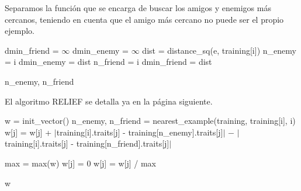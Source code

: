 \documentclass[12pt]{article}
\begin{document}
Separamos la función que se encarga de buscar los amigos y enemigos más cercanos, teniendo en cuenta que el amigo más cercano no puede ser el propio ejemplo.

\begin{algorithm}[h]
\begin{algorithmic}

     \State dmin\_friend = $\infty$
     \State dmin\_enemy = $\infty$
       
            \State dist = distance\_sq(e, training[i])
                  \State n\_enemy = i
                  \State dmin\_enemy = dist
                  \State n\_friend = i
                  \State dmin\_friend = dist

   \Return n\_enemy, n\_friend
\EndFunction

\end{algorithmic}
\end{algorithm}

El algoritmo RELIEF se detalla ya en la página siguiente.
\newpage

\begin{algorithm}[h!]
\begin{algorithmic}

     \State w = init\_vector()
       
         \State n\_enemy, n\_friend = nearest\_example(training, training[i], i)
           
            \State w[j] = w[j] + $|$training[i].traits[j] - training[n\_enemy].traits[j]$|$
            \State \hspace{2.5em} $-$ $|$training[i].traits[j] - training[n\_friend].traits[j]$|$
          
         \EndFor
      \EndFor
      \State max = max(w)
        
            \State w[j] = 0
        \Else
            \State w[j] = w[j] / max
        \EndIf
      
\hspace{-.7em} \Return w
\EndFunction

\end{algorithmic}
\end{algorithm}
\end{document}
